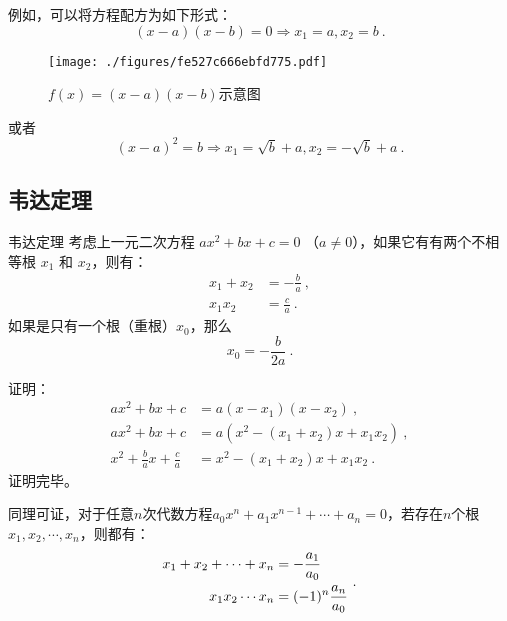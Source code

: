 例如，可以将方程配方为如下形式：
$$(x-a)(x-b)=0\Rightarrow x_1=a, x_2=b~.$$
\begin{figure}[ht]
\centering
\texttt{[image: ./figures/fe527c666ebfd775.pdf]}
\caption{$f(x)=(x-a)(x-b)$示意图} \label{fig_quasol_2}
\end{figure}
或者
$$(x-a)^2=b\Rightarrow x_1=\sqrt{b}+a, x_2=-\sqrt{b}+a~.$$

\subsection{韦达定理}

\begin{theorem}{韦达定理}
考虑上一元二次方程 $a x^2 + b x + c = 0$ （$a \neq 0$），如果它有有两个不相等根 $x_1$ 和 $x_2$，则有：
$$\begin{aligned}
x_1 + x_2 &= -\frac{b}{a} ~,\\
x_1 x_2 &= \frac{c}{a}~.
\end{aligned}$$
如果是只有一个根（重根）$x_0$，那么
$$
x_0 = - \frac{b}{2 a}~.
$$
\end{theorem}

证明：
$$\begin{aligned}
a x^2 + b x + c &= a (x - x_1) (x - x_2) ~,\\
a x^2 + b x + c &= a (x^2 - (x_1 + x_2) x + x_1 x_2)~, \\
x^2 + \frac{b}{a} x + \frac{c}{a} &=  x^2 - (x_1 + x_2) x + x_1 x_2~.
\end{aligned}$$
证明完毕。

同理可证，对于任意$n$次代数方程$a_0x^n+a_1x^{n-1}+\cdots+a_n=0$，若存在$n$个根$x_1,x_2,\cdots,x_n$，则都有：
\begin{equation}
\begin{split}
x_1+x_2+\cdots +x_n&=-{a_1\over a_0}\\
x_1x_2\cdots x_n&=(-1)^n{a_n\over a_0}
\end{split}~.
\end{equation}
